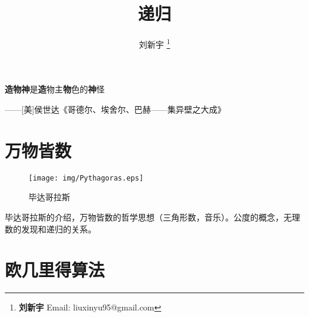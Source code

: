 \documentclass[UTF8]{article}
\begin{document}
\title{递归}

\author{刘新宇
\thanks{{\bfseries 刘新宇} \newline
  Email: liuxinyu95@gmail.com \newline}
  }

\maketitle
\fi


\epigraph{\textbf{造物神}是\textbf{造}物主\textbf{物}色的\textbf{神}怪}{——[美]侯世达《哥德尔、埃舍尔、巴赫——集异壁之大成》}

\section{万物皆数}

\begin{wrapfigure}{R}{0.3\textwidth}
 \centering
 \texttt{[image: img/Pythagoras.eps]}
 \captionsetup{labelformat=empty}
 \caption{毕达哥拉斯}
 \label{fig:Pythagoras}
\end{wrapfigure}

毕达哥拉斯的介绍，万物皆数的哲学思想（三角形数，音乐）。公度的概念，无理数的发现和递归的关系。




\section{欧几里得算法}
\end{document}
